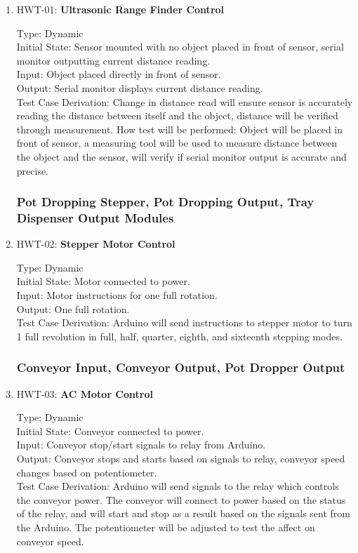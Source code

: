 \documentclass[12pt, titlepage]{article}
\begin{document}
\begin{enumerate}

  \item{HWT-01: \textbf{Ultrasonic Range Finder Control}}
  
Type: Dynamic\\
Initial State: Sensor mounted with no object placed in front of sensor, serial monitor outputting
 current distance reading.\\
Input: Object placed directly in front of sensor.\\
Output: Serial monitor displays current distance reading.\\
Test Case Derivation: Change in distance read will ensure sensor is accurately reading the distance 
between itself and the object, distance will be verified through measurement.
How test will be performed: Object will be placed in front of sensor, a measuring tool will be used to 
measure distance between the object and the sensor, will verify if serial monitor output is accurate and precise.\\


\subsubsection{Pot Dropping Stepper, Pot Dropping Output, Tray Dispenser Output Modules}

  \item{HWT-02: \textbf{Stepper Motor Control}}
  
Type: Dynamic\\
Initial State: Motor connected to power.\\
Input: Motor instructions for one full rotation.\\
Output: One full rotation.\\
Test Case Derivation: Arduino will send instructions to stepper motor to turn 1 full revolution in full,
half, quarter, eighth, and sixteenth stepping modes.\\

\subsubsection{Conveyor Input, Conveyor Output, Pot Dropper Output}

  \item{HWT-03: \textbf{AC Motor Control}}
  
Type: Dynamic\\
Initial State: Conveyor connected to power.\\
Input: Conveyor stop/start signals to relay from Arduino.\\
Output: Conveyor stops and starts based on signals to relay, conveyor speed changes based on potentiometer.\\
Test Case Derivation: Arduino will send signals to the relay which controls the conveyor power. The conveyor 
will connect to power based on the status of the relay, and will start and stop as a result based on the signals 
sent from the Arduino. The potentiometer will be adjusted to test the affect on conveyor speed. \\
  
\end{enumerate}
\end{document}
